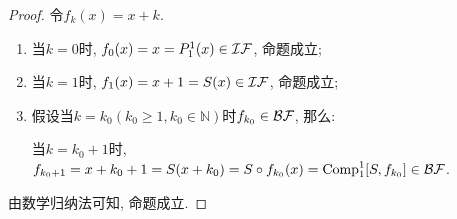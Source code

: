 \begin{proof}
令$f_k(x)=x+k$.
\begin{enumerate}
\item 当$k=0$时, $f_0(x)=x=P_1^1(x)\in\mathcal{IF}$, 命题成立;
\item 当$k=1$时, $f_1(x)=x+1=S(x)\in\mathcal{IF}$, 命题成立;
\item 假设当$k=k_0(k_0\geqslant 1,k_0\in\mathbb{N})$时$f_{k_0}\in\mathcal{BF}$, 那么:

当$k=k_0+1$时,$f_{k_0+1}=x+k_0+1=S(x+k_0)=S\circ f_{k_0}(x)=\mathrm{Comp}^1_1[S,f_{k_0}]\in\mathcal{BF}$.
\end{enumerate}

由数学归纳法可知, 命题成立.
\end{proof}